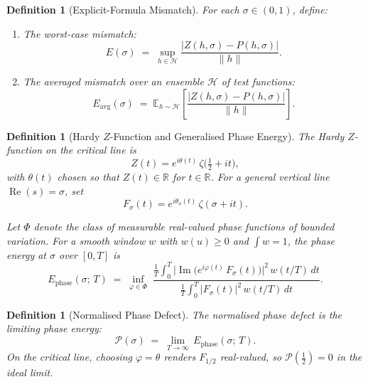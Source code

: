\documentclass[11pt]{article}
\newtheorem{definition}[theorem]{Definition}
\theoremstyle{remark}
\DeclareMathOperator{\Ima}{Im}
\DeclareMathOperator{\Rea}{Re}
\begin{document}

\begin{definition}[Explicit-Formula Mismatch]
\label{def:ef-mismatch}
For each $\sigma\in(0,1)$, define:
\begin{enumerate}
\item[\textbf{(i)}]
  The \emph{worst-case mismatch}:
  \[
    E(\sigma)
    \;=\;
    \sup_{h\in\mathcal{H}}
    \frac{\bigl\lvert Z(h,\sigma) - P(h,\sigma)\bigr\rvert}
         {\lVert h\rVert}.
  \]
\item[\textbf{(ii)}]
  The \emph{averaged mismatch} over an ensemble $\mathcal{H}$ of
  test functions:
  \[
    E_{\mathrm{avg}}(\sigma)
    \;=\;
    \mathbb{E}_{h\sim\mathcal{H}}\!\left[
    \frac{\bigl\lvert Z(h,\sigma) - P(h,\sigma)\bigr\rvert}
         {\lVert h\rVert}
    \right].
  \]
\end{enumerate}
\end{definition}


\begin{definition}[Hardy $Z$-Function and Generalised Phase Energy]
\label{def:phase-energy}
The Hardy $Z$-function on the critical line is
\[
  Z(t) = e^{i\theta(t)}\,\zeta\!\bigl(\tfrac{1}{2}+it\bigr),
\]
with $\theta(t)$ chosen so that $Z(t)\in\mathbb{R}$ for $t\in\mathbb{R}$.
For a general vertical line $\Rea(s)=\sigma$, set
\[
  F_{\sigma}(t) = e^{i\theta_{\sigma}(t)}\,\zeta(\sigma+it).
\]

Let $\Phi$ denote the class of measurable real-valued phase functions
of bounded variation.  For a smooth window $w$ with $w(u)\geq 0$
and $\int w = 1$, the \emph{phase energy} at $\sigma$ over
$[0,T]$ is
\[
  E_{\mathrm{phase}}(\sigma;\,T)
  \;=\;
  \inf_{\varphi\in\Phi}\;
  \frac{\displaystyle
    \frac{1}{T}\int_{0}^{T}
      \bigl\lvert
        \Ima\!\bigl(e^{i\varphi(t)}\,F_{\sigma}(t)\bigr)
      \bigr\rvert^{2}\,
      w(t/T)\,dt}
  {\displaystyle
    \frac{1}{T}\int_{0}^{T}
      \bigl\lvert F_{\sigma}(t)\bigr\rvert^{2}\,
      w(t/T)\,dt}.
\]
\end{definition}

\begin{definition}[Normalised Phase Defect]
\label{def:phase-defect}
The \emph{normalised phase defect} is the limiting phase energy:
\[
  \mathcal{P}(\sigma)
  \;=\;
  \lim_{T\to\infty}\, E_{\mathrm{phase}}(\sigma;\,T).
\]
On the critical line, choosing $\varphi = \theta$ renders $F_{1/2}$
real-valued, so $\mathcal{P}(\tfrac{1}{2}) = 0$ in the ideal limit.
\end{definition}
\end{document}

